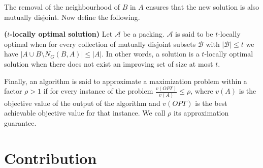 %
The removal of the neighbourhood of $B$ in $A$ ensures that the new solution is also mutually disjoint. %
Now define the following.

\begin{defn}
\textbf{($t$-locally optimal solution)} Let $\mathcal{A}$ be a packing. $\mathcal{A}$ is said to be $t$-locally optimal when for every collection of mutually disjoint subsets $\mathcal{B}$ with $|\mathcal{B}| \leq t$ we have $\left| A \cup B \setminus N_G(B,A) \right| \leq |A|$. In other words, a solution is a $t$-locally optimal solution when there does not exist an improving set of size at most $t$.
\end{defn}

Finally, an algorithm is said to approximate a maximization problem within a factor $\rho>1$ if for every instance of the problem $\frac{v(OPT)}{v(A)} \leq \rho$, where $v(A)$ is the objective value of the output of the algorithm and $v(OPT)$ is the best achievable objective value for that instance. We call $\rho$ its approximation guarantee.


\section{Contribution}\label{sec:Contribution}


